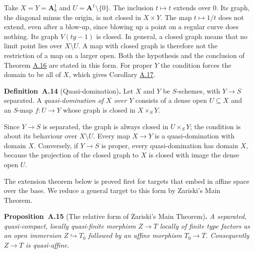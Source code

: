 \documentclass[11pt]{article}
\newenvironment{bpstatement}[2]{\par\addvspace{0.6\baselineskip}\noindent\textbf{#1}#2\textbf{.}\enspace\ignorespaces}
  {\par\addvspace{0.4\baselineskip}}
\newenvironment{bpstatementit}[2]{\begin{bpstatement}{#1}{#2}\itshape\ignorespaces}{\end{bpstatement}}
\begin{document}
Take \(X=Y=\mathbf A^1_k\) and \(U=\mathbf A^1\setminus\{0\}\). The inclusion \(t\mapsto t\) extends over \(0\). Its graph, the diagonal minus the origin, is not closed in \(X\times Y\). The map \(t\mapsto1/t\) does not extend, even after a blow-up, since blowing up a point on a regular curve does nothing. Its graph \(V(ty-1)\) is closed. In general, a closed graph means that no limit point lies over \(X\setminus U\). A map with closed graph is therefore not the restriction of a map on a larger open. Both the hypothesis and the conclusion of Theorem \hyperref[bp43]{A.16} are stated in this form. For proper \(Y\) the condition forces the domain to be all of \(X\), which gives Corollary \hyperref[bp45]{A.17}.

\label{bp38}%
\begin{bpstatement}{Definition~A.14}{ (Quasi-domination)}
Let \(X\) and \(Y\) be \(S\)-schemes, with \(Y\to S\) separated. A \emph{quasi-domination of \(X\) over \(Y\)} consists of a dense open \(U\subseteq X\) and an \(S\)-map \(f:U\to Y\) whose graph is closed in \(X\times_SY\).
\end{bpstatement}

\label{bp39}%
Since \(Y\to S\) is separated, the graph is always closed in \(U\times_SY\); the condition is about its behaviour over \(X\setminus U\). Every map \(X\to Y\) is a quasi-domination with domain \(X\). Conversely, if \(Y\to S\) is proper, every quasi-domination has domain \(X\), because the projection of the closed graph to \(X\) is closed with image the dense open \(U\).

The extension theorem below is proved first for targets that embed in affine space over the base. We reduce a general target to this form by Zariski's Main Theorem.

\label{bp40}%
\begin{bpstatementit}{Proposition~A.15}{ (The relative form of Zariski's Main Theorem)}
A separated, quasi-compact, locally quasi-finite morphism \(Z\to T\) locally of finite type factors as an open immersion \(Z\hookrightarrow T_0\) followed by an affine morphism \(T_0\to T\). Consequently \(Z\to T\) is quasi-affine.
\end{bpstatementit}
\end{document}
